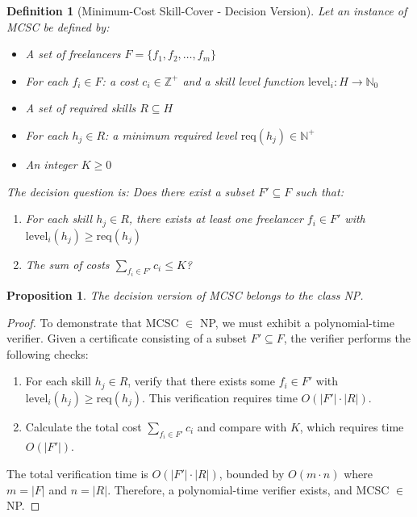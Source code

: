 \documentclass[12pt,a4paper]{article}
\newtheorem{definition}{Definition}[section]
\newtheorem{proposition}{Proposition}[section]
\newtheorem{proof}{Proof}
\begin{document}
\begin{definition}[Minimum-Cost Skill-Cover - Decision Version]
	Let an instance of MCSC be defined by:
	\begin{itemize}
		\item A set of freelancers $F = \{f_1, f_2, \ldots, f_m\}$
		\item For each $f_i \in F$: a cost $c_i \in \mathbb{Z}^+$ and a skill level function $\text{level}_i: H \rightarrow \mathbb{N}_0$
		\item A set of required skills $R \subseteq H$
		\item For each $h_j \in R$: a minimum required level $\text{req}(h_j) \in \mathbb{N}^+$
		\item An integer $K \geq 0$
	\end{itemize}
	The decision question is: Does there exist a subset $F' \subseteq F$ such that:
	\begin{enumerate}
		\item For each skill $h_j \in R$, there exists at least one freelancer $f_i \in F'$ with $\text{level}_i(h_j) \geq \text{req}(h_j)$
		\item The sum of costs $\sum_{f_i \in F'} c_i \leq K$?
	\end{enumerate}
\end{definition}

\begin{proposition}
	The decision version of MCSC belongs to the class NP.
\end{proposition}

\begin{proof}
	To demonstrate that MCSC $\in$ NP, we must exhibit a polynomial-time verifier. Given a certificate consisting of a subset $F' \subseteq F$, the verifier performs the following checks:
	
	\begin{enumerate}
		\item For each skill $h_j \in R$, verify that there exists some $f_i \in F'$ with $\text{level}_i(h_j) \geq \text{req}(h_j)$. This verification requires time $O(|F'| \cdot |R|)$.
		\item Calculate the total cost $\sum_{f_i \in F'} c_i$ and compare with $K$, which requires time $O(|F'|)$.
	\end{enumerate}
	
	The total verification time is $O(|F'| \cdot |R|)$, bounded by $O(m \cdot n)$ where $m = |F|$ and $n = |R|$. Therefore, a polynomial-time verifier exists, and MCSC $\in$ NP.
\end{proof}
\end{document}
